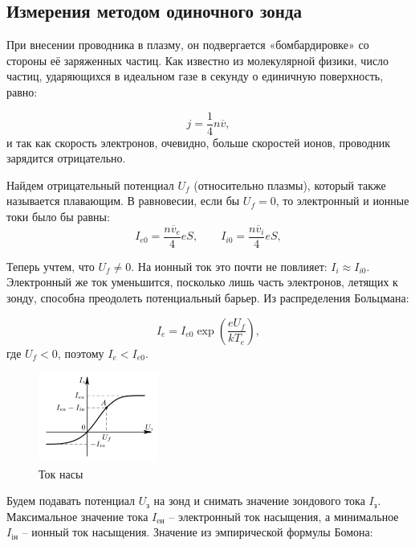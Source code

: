 \documentclass[a4paper]{article}
\begin{document}
\subsection{Измерения методом одиночного зонда}

При внесении проводника в плазму, он подвергается «бомбардировке» со стороны её заряженных частиц.
Как известно из молекулярной физики, число частиц,
ударяющихся в идеальном газе в секунду о единичную поверхность, равно:

\begin{equation}
    j = \frac{1}{4} n \overline{v},
\end{equation}
и так как скорость электронов, очевидно, больше скоростей ионов, проводник зарядится отрицательно.

Найдем отрицательный потенциал $U_f$ (относительно плазмы), который также называется плавающим.
В равновесии, если бы $U_f = 0$, то электронный и ионные токи было бы равны:
\begin{equation}
    I_{e0} = \frac{n \overline{v}_e}{4}eS, \qquad I_{i0} = \frac{n \overline{v}_i}{4}eS,
\end{equation}

Теперь учтем, что $U_f \neq 0$. На ионный ток это почти не повлияет: $I_i \approx I_{i0}$.
Электронный же ток уменьшится, посколько лишь часть электронов, летящих к зонду,
способна преодолеть потенциальный барьер. Из распределения Больцмана:

\begin{equation}
    I_e = I_{e0} \exp(\frac{eU_f}{kT_e}), 
\end{equation}
где $U_f < 0$, поэтому $I_e < I_{e0}$.

\begin{figure}
    \includegraphics[width = 0.35\textwidth]{bomon.png}
    \caption[width = 0.95\textwidth]{Ток насы}
\end{figure}

Будем подавать потенциал $U_\text{з}$ на зонд и снимать значение
зондового тока $I_\text{з}$. Максимальное значение тока $I_\text{eн}$ – электронный ток насыщения,
а минимальное $I_\text{iн}$ – ионный ток насыщения.
Значение из эмпирической формулы Бомона:
\end{document}

